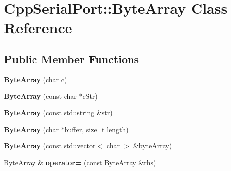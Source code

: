 \hypertarget{class_cpp_serial_port_1_1_byte_array}{}\section{Cpp\+Serial\+Port\+:\+:Byte\+Array Class Reference}
\label{class_cpp_serial_port_1_1_byte_array}
\subsection*{Public Member Functions}
\begin{DoxyCompactItemize}
\item 
\mbox{\label{class_cpp_serial_port_1_1_byte_array_a3835532697d7ef23ce67c5c700a0cb79}} 
{\bfseries Byte\+Array} (char c)
\item 
\mbox{\label{class_cpp_serial_port_1_1_byte_array_a3ceb66dbb01620ca3836dbbe931284dd}} 
{\bfseries Byte\+Array} (const char $\ast$c\+Str)
\item 
\mbox{\label{class_cpp_serial_port_1_1_byte_array_a3883ddeeadd56c022052d33315e07e01}} 
{\bfseries Byte\+Array} (const std\+::string \&str)
\item 
\mbox{\label{class_cpp_serial_port_1_1_byte_array_a8665a2be617f7069530f8c9791b19b4f}} 
{\bfseries Byte\+Array} (char $\ast$buffer, size\+\_\+t length)
\item 
\mbox{\label{class_cpp_serial_port_1_1_byte_array_af07ee95b3a54ec839bbea1fa8a6f3d0e}} 
{\bfseries Byte\+Array} (const std\+::vector$<$ char $>$ \&byte\+Array)
\item 
\mbox{\label{class_cpp_serial_port_1_1_byte_array_a46fe561f131958df56257d94b2ea6436}} 
\mbox{\hyperlink{class_cpp_serial_port_1_1_byte_array}{Byte\+Array}} \& {\bfseries operator=} (const \mbox{\hyperlink{class_cpp_serial_port_1_1_byte_array}{Byte\+Array}} \&rhs)
\item 
\mbox{\label{class_cpp_serial_port_1_1_byte_array_ac225b1ab9472ad2d6be54b9c402750b6}} 

\end{DoxyCompactItemize}
